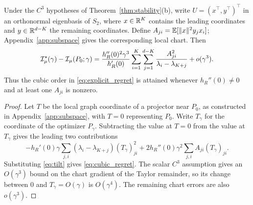 \begin{corollary}\label{cor:cubic_regret}
Under the $C^3$ hypotheses of Theorem~\ref{thm:stability}(b), write $U=(x^{\top},y^{\top})^{\top}$ in an orthonormal eigenbasis of $S_2$, where $x\in\mathbb R^K$ contains the leading coordinates and $y\in\mathbb R^{d-K}$ the remaining coordinates. Define $A_{ji}=\mathbb E[\|x\|^2y_jx_i]$; Appendix~\ref{app:subspace} gives the corresponding local chart. Then
\begin{equation}
\mathcal I_\mu^\star(\gamma)-\mathcal I_\mu(P_0;\gamma)
=\frac{h_R''(0)^2\gamma^3}{h_R'(0)}
\sum_{i=1}^K\sum_{j=1}^{d-K}\frac{A_{ji}^2}{\lambda_i-\lambda_{K+j}}+o(\gamma^3).
\label{eq:cubic_regret}
\end{equation}
Thus the cubic order in \eqref{eq:explicit_regret} is attained whenever $h_R''(0)\ne0$ and at least one $A_{ji}$ is nonzero.
\end{corollary}
\begin{proof}
Let $T$ be the local graph coordinate of a projector near $P_0$, as
constructed in Appendix~\ref{app:subspace}, with $T=0$ representing $P_0$.
Write $T_\gamma$ for the coordinate of the optimizer $P_\gamma$.
Subtracting the value at $T=0$ from the value at $T_\gamma$ gives the
leading two contributions
\begin{equation*}
-h_R'(0)\gamma\sum_{j,i}(\lambda_i-\lambda_{K+j})(T_\gamma)_{ji}^2
+2h_R''(0)\gamma^2\sum_{j,i}A_{ji}(T_\gamma)_{ji}.
\end{equation*}
Substituting \eqref{eq:tilt} gives \eqref{eq:cubic_regret}. The scalar $C^3$ assumption gives an $O(\gamma^3)$ bound on the chart gradient of the Taylor remainder, so its change between $0$ and $T_\gamma=O(\gamma)$ is $O(\gamma^4)$. The remaining chart errors are also $o(\gamma^3)$.
\end{proof}
